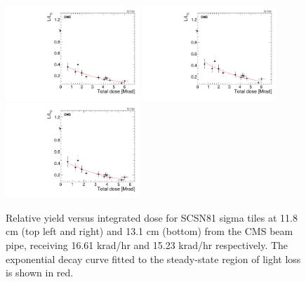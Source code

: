 \begin{figure}[tbp!]
\centering
\includegraphics[width=0.45\textwidth]{figures/SCSN81-S-11p8cm-f3ch0-dose.pdf}
\includegraphics[width=0.45\textwidth]{figures/SCSN81-S-11p8cm-f20ch1-dose.pdf}
\includegraphics[width=0.45\textwidth]{figures/SCSN81-S-13p1cm-f7ch5-dose.pdf}
\caption{Relative yield versus integrated dose for SCSN81 sigma tiles at 11.8 cm (top left and right) and 13.1 cm (bottom) from the CMS beam pipe, receiving 16.61 krad/hr and 15.23 krad/hr respectively. The exponential decay curve fitted to the steady-state region of light loss is shown in red.}
\label{fig:SCSN81-S-11p8cm-dose}
\end{figure} 

